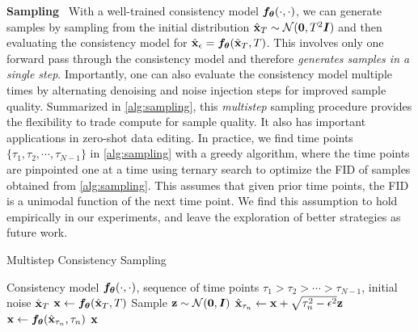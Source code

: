 \textbf{Sampling}~ With a well-trained consistency model ${\bm{f}}_{\bm{\theta}}(\cdot, \cdot)$, we can generate samples by sampling from the initial distribution $\hat{{\mathbf{x}}}_T \sim \mathcal{N}(\bm{0}, T^2 {\bm{I}})$ and then evaluating the consistency model for $\hat{{\mathbf{x}}}_\epsilon = {\bm{f}}_{\bm{\theta}}(\hat{{\mathbf{x}}}_T, T)$. This involves only one forward pass through the consistency model and therefore \emph{generates samples in a single step}. Importantly, one can also evaluate the consistency model multiple times by alternating denoising and noise injection steps for improved sample quality. Summarized in \cref{alg:sampling}, this \emph{multistep} sampling procedure provides the flexibility to trade compute for sample quality. It also has important applications in zero-shot data editing. In practice, we find time points $\{\tau_1, \tau_2, \cdots, \tau_{N-1}\}$ in \cref{alg:sampling} with a greedy algorithm, where the time points are pinpointed one at a time using ternary search to optimize the FID of samples obtained from \cref{alg:sampling}. This assumes that given prior time points, the FID is a unimodal function of the next time point. We find this assumption to hold empirically in our experiments, and leave the exploration of better strategies as future work.

\begin{algorithm}[tb]
    \caption{Multistep Consistency Sampling}
    \label{alg:sampling}
 \begin{algorithmic}
     Consistency model ${\bm{f}}_{\bm{\theta}}(\cdot, \cdot)$, sequence of time points $\tau_1 > \tau_2 > \cdots > \tau_{N-1}$, initial noise $\hat{{\mathbf{x}}}_T$
    \STATE ${\mathbf{x}} \gets {\bm{f}}_{\bm{\theta}}(\hat{{\mathbf{x}}}_T, T)$
        \STATE Sample ${\mathbf{z}} \sim \mathcal{N}(\bm{0}, {\bm{I}})$
        \STATE $\hat{{\mathbf{x}}}_{\tau_n} \gets {\mathbf{x}} + \sqrt{\tau_n^2 - \epsilon^2} {\mathbf{z}}$
        \STATE ${\mathbf{x}} \gets {\bm{f}}_{\bm{\theta}}(\hat{{\mathbf{x}}}_{\tau_n}, \tau_n)$
    \ENDFOR
     ${\mathbf{x}}$
 \end{algorithmic}
\end{algorithm}

